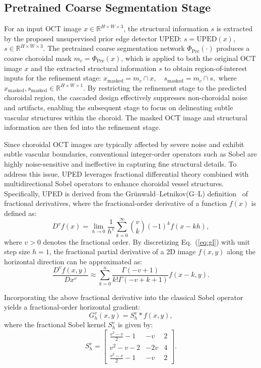 \documentclass[lettersize,journal]{IEEEtran}
\begin{document}
\subsection{Pretrained Coarse Segmentation Stage}
{\color{red}For an input OCT image $x \in \mathbb{R}^{H \times W \times 3}$, the structural information $s$ is extracted by the proposed unsupervised prior edge detector $\text{UPED}$: $s = \text{UPED}(x)$, $s \in \mathbb{R}^{H \times W \times 3}$. The pretrained coarse segmentation network $\varPhi_{\text{Pre}}(\cdot)$ produces a coarse choroidal mask $m_c = \varPhi_{\text{Pre}}(x)$, which is applied to both the original OCT image $x$ and the extracted structural information $s$ to obtain region-of-interest inputs for the refinement stage:
$x_{\text{masked}} = m_c \cap x, \quad s_{\text{masked}} = m_c \cap s,$ where $x_{\text{masked}}, s_{\text{masked}} \in \mathbb{R}^{H \times W \times 1}$.
By restricting the refinement stage to the predicted choroidal region, the cascaded design effectively suppresses non-choroidal noise and artifacts, enabling the subsequent stage to focus on delineating subtle vascular structures within the choroid.
The masked OCT image and structural information are then fed into the refinement stage.}

Since choroidal OCT images are typically affected by severe noise and exhibit subtle vascular boundaries, conventional integer-order operators such as Sobel are highly noise-sensitive and ineffective in capturing fine structural details.
To address this issue, UPED leverages fractional differential theory combined with multidirectional Sobel operators to enhance choroidal vessel structures.
Specifically, UPED is derived from the Grünwald--Letnikov(G--L) definition~\cite{G_L} of fractional derivatives, where the fractional-order derivative of a function $f(x)$ is defined as:
\begin{equation}
D^{v} f(x)=\lim_{h \to 0} \frac{1}{h^{v}} \sum_{k=0}^{\infty} \binom{v}{k} (-1)^k f(x-kh),
\label{eq:gl}
\end{equation}
where $v>0$ denotes the fractional order.
By discretizing Eq.~(\ref{eq:gl}) with unit step size $h=1$, the fractional partial derivative of a 2D image $f(x,y)$ along the horizontal direction can be approximated as:
\begin{equation}
\frac{D^{v} f(x,y)}{D x^{v}} \approx \sum_{k=0}^{n} \frac{\Gamma(-v+1)}{k!\Gamma(-v+k+1)} f(x-k,y).
\label{eq:frac_discrete}
\end{equation}

Incorporating the above fractional derivative into the classical Sobel operator yields a fractional-order horizontal gradient:
\begin{equation}
G_h^v(x,y) = S_h^v \ast f(x,y),
\end{equation}
where the fractional Sobel kernel $S_h^v$ is given by:
\begin{equation}
S_{h}^{v}=
\begin{bmatrix}
 \frac{v^2-v}{2}-1 & -v & 2 \\ 
 v^2-v-2 & -2v & 4 \\ 
 \frac{v^2-v}{2}-1 & -v & 2
\end{bmatrix}.
\label{eq:frac_sobel}
\end{equation}
\end{document}
